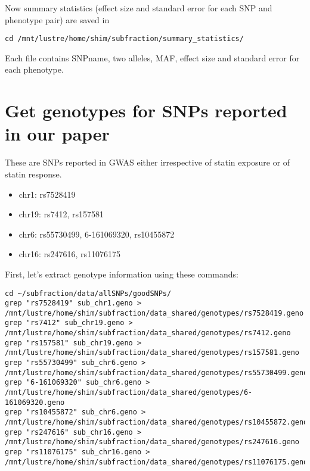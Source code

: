 \documentclass[11pt]{article}
\begin{document}
Now summary statistics (effect size and standard error for each SNP and phenotype pair) are saved in 
\begin{lstlisting}
cd /mnt/lustre/home/shim/subfraction/summary_statistics/
\end{lstlisting}
Each file contains SNPname, two alleles, MAF, effect size and standard error for each phenotype.
\section{Get genotypes for SNPs reported in our paper}
\label{sec-5}
These are SNPs reported in GWAS either irrespective of statin exposure or of statin response.
\begin{itemize}
\item chr1: rs7528419
\item chr19: rs7412, rs157581
\item chr6: rs55730499, 6-161069320, rs10455872
\item chr16: rs247616, rs11076175
\end{itemize}

First, let's extract genotype information using these commands:
\begin{lstlisting}
cd ~/subfraction/data/allSNPs/goodSNPs/
grep "rs7528419" sub_chr1.geno > /mnt/lustre/home/shim/subfraction/data_shared/genotypes/rs7528419.geno
grep "rs7412" sub_chr19.geno > /mnt/lustre/home/shim/subfraction/data_shared/genotypes/rs7412.geno
grep "rs157581" sub_chr19.geno > /mnt/lustre/home/shim/subfraction/data_shared/genotypes/rs157581.geno
grep "rs55730499" sub_chr6.geno > /mnt/lustre/home/shim/subfraction/data_shared/genotypes/rs55730499.geno
grep "6-161069320" sub_chr6.geno > /mnt/lustre/home/shim/subfraction/data_shared/genotypes/6-161069320.geno
grep "rs10455872" sub_chr6.geno > /mnt/lustre/home/shim/subfraction/data_shared/genotypes/rs10455872.geno
grep "rs247616" sub_chr16.geno > /mnt/lustre/home/shim/subfraction/data_shared/genotypes/rs247616.geno
grep "rs11076175" sub_chr16.geno > /mnt/lustre/home/shim/subfraction/data_shared/genotypes/rs11076175.geno
\end{lstlisting}
\end{document}
